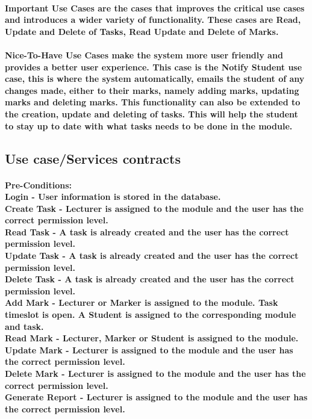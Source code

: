 \documentclass[12pt]{article}
\begin{document}
 \paragraph*{Important Use Cases are the cases that improves the critical use cases and introduces a wider variety of functionality. These cases are Read, Update and Delete of Tasks, Read Update  and Delete of Marks.}
 \paragraph*{Nice-To-Have Use Cases make the system more user friendly and provides a better user experience. This case is the Notify Student use case, this is where the system automatically, emails the student of any changes made, either to their marks, namely adding marks, updating marks and deleting marks. This functionality can also be extended to the creation, update and deleting of tasks. This will help the student to stay up to date with what tasks needs to be done in the module.}
 \subsection{Use case/Services contracts}
 \paragraph*{Pre-Conditions: \\ Login - User information is stored in the database.
 \\ Create Task - Lecturer is assigned to the module and the user has the correct permission level.
 \\ Read Task - A task is already created and the user has the correct permission level.
 \\ Update Task - A task is already created and the user has the correct permission level.
 \\ Delete Task - A task is already created and the user has the correct permission level.
 \\ Add Mark - Lecturer or Marker is assigned to the module. Task timeslot is open. A Student is assigned to the corresponding module and task.
 \\ Read Mark - Lecturer, Marker or Student is assigned to the module.
 \\ Update Mark - Lecturer is assigned to the module and the user has the correct permission level.
 \\ Delete Mark - Lecturer is assigned to the module and the user has the correct permission level.
 \\ Generate Report - Lecturer is assigned to the module and the user has the correct permission level.}
\end{document}
